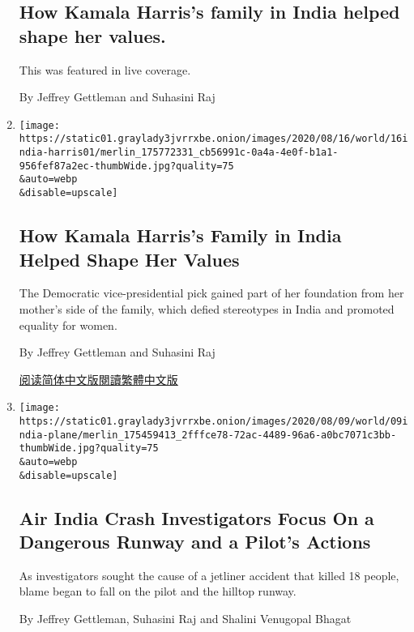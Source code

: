 \begin{enumerate}
  \hypertarget{how-kamala-harriss-family-in-india-helped-shape-her-values}{%
  \subsection{How Kamala Harris's family in India helped shape her
  values.}\label{how-kamala-harriss-family-in-india-helped-shape-her-values}}

  This was featured in live coverage.

  By Jeffrey Gettleman and Suhasini Raj
\item
  \href{/2020/08/16/world/asia/kamala-harris-india.html}{}

  \texttt{[image: https://static01.graylady3jvrrxbe.onion/images/2020/08/16/world/16india-harris01/merlin\_175772331\_cb56991c-0a4a-4e0f-b1a1-956fef87a2ec-thumbWide.jpg?quality=75\\\&auto=webp\\\&disable=upscale]}

  \hypertarget{how-kamala-harriss-family-in-india-helped-shape-her-values-1}{%
  \subsection{How Kamala Harris's Family in India Helped Shape Her
  Values}\label{how-kamala-harriss-family-in-india-helped-shape-her-values-1}}

  The Democratic vice-presidential pick gained part of her foundation
  from her mother's side of the family, which defied stereotypes in
  India and promoted equality for women.

  By Jeffrey Gettleman and Suhasini Raj

  \href{https://cn.nytimes3xbfgragh.onion/usa/20200817/kamala-harris-india/}{阅读简体中文版}\href{https://cn.nytimes3xbfgragh.onion/usa/20200817/kamala-harris-india/zh-hant/}{閱讀繁體中文版}
\item
  \href{/2020/08/08/world/asia/india-plane-crash-dubai.html}{}

  \texttt{[image: https://static01.graylady3jvrrxbe.onion/images/2020/08/09/world/09india-plane/merlin\_175459413\_2fffce78-72ac-4489-96a6-a0bc7071c3bb-thumbWide.jpg?quality=75\\\&auto=webp\\\&disable=upscale]}

  \hypertarget{air-india-crash-investigators-focus-on-a-dangerous-runway-and-a-pilots-actions}{%
  \subsection{Air India Crash Investigators Focus On a Dangerous Runway
  and a Pilot's
  Actions}\label{air-india-crash-investigators-focus-on-a-dangerous-runway-and-a-pilots-actions}}

  As investigators sought the cause of a jetliner accident that killed
  18 people, blame began to fall on the pilot and the hilltop runway.

  By Jeffrey Gettleman, Suhasini Raj and Shalini Venugopal Bhagat
\end{enumerate}

